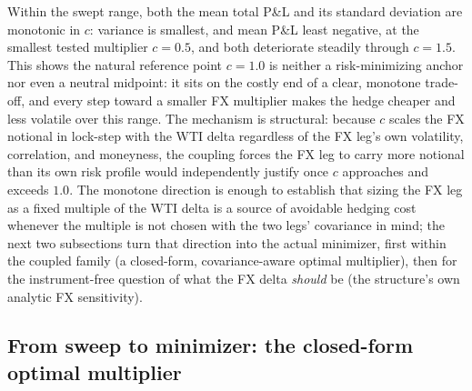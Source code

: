 \documentclass[11pt,a4paper]{article}
\begin{document}
Within the swept range, both the mean total P\&L and its standard deviation are monotonic in $c$: variance is smallest, and mean P\&L least negative, at the smallest tested multiplier $c=0.5$, and both deteriorate steadily through $c=1.5$. This shows the natural reference point $c=1.0$ is neither a risk-minimizing anchor nor even a neutral midpoint: it sits on the costly end of a clear, monotone trade-off, and every step toward a smaller FX multiplier makes the hedge cheaper and less volatile over this range. The mechanism is structural: because $c$ scales the FX notional in lock-step with the WTI delta regardless of the FX leg's own volatility, correlation, and moneyness, the coupling forces the FX leg to carry more notional than its own risk profile would independently justify once $c$ approaches and exceeds $1.0$. The monotone direction is enough to establish that sizing the FX leg as a fixed multiple of the WTI delta is a source of avoidable hedging cost whenever the multiple is not chosen with the two legs' covariance in mind; the next two subsections turn that direction into the actual minimizer, first within the coupled family (a closed-form, covariance-aware optimal multiplier), then for the instrument-free question of what the FX delta \emph{should} be (the structure's own analytic FX sensitivity).

\subsection{From sweep to minimizer: the closed-form optimal multiplier}
\label{sec:cstar}
\end{document}

